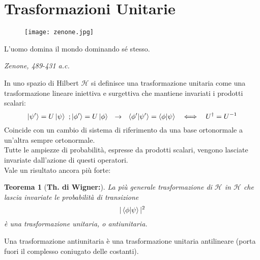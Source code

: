 \documentclass[twoside]{article}
\newtheorem{theorem}{Teorema}[section]
\begin{document}
\section{Trasformazioni Unitarie}

\begin{wrapfigure}[4]{L}{0.2\textwidth}
  \begin{center}
    \texttt{[image: zenone.jpg]}
  \end{center}
\end{wrapfigure}\leavevmode

\vspace{10mm}
\epigraph{L'uomo domina il mondo dominando sé stesso.}{\textit{Zenone, 489-431 a.c.}}
\vspace{10mm}

In uno spazio di Hilbert $\mathcal{H}$ si definisce una trasformazione unitaria come una trasformazione lineare iniettiva e surgettiva che mantiene invariati i prodotti scalari:
\begin{equation}
    \ket{\psi'}=U\ket{\psi} \ ; \ket{\phi'}=U\ket{\phi} \ \ \rightarrow \ \ \bra{\phi'}\ket{\psi'}=\bra{\phi}\ket{\psi} \ \ \iff \ \ U^{\dagger}=U^{-1}
\end{equation}
Coincide con un cambio di sistema di riferimento da una base ortonormale a un'altra sempre ortonormale.
\\
Tutte le ampiezze di probabilità, espresse da prodotti scalari, vengono lasciate invariate dall'azione di questi operatori.
\\
Vale un risultato ancora più forte:

\begin{theorem}[\textbf{Th. di Wigner:}]\label{Wigner} La più generale trasformazione di
$\mathcal{H}$ in $\mathcal{H}$ che lascia invariate le probabilità di transizione
\begin{equation*}
    |\bra{\phi}\ket{\psi}|^2
\end{equation*}
è una trasformazione unitaria, o antiunitaria.
\end{theorem}

Una trasformazione antiunitaria è una trasformazione unitaria antilineare (porta fuori il complesso coniugato delle costanti).

\vspace{0.5cm}
\end{document}
